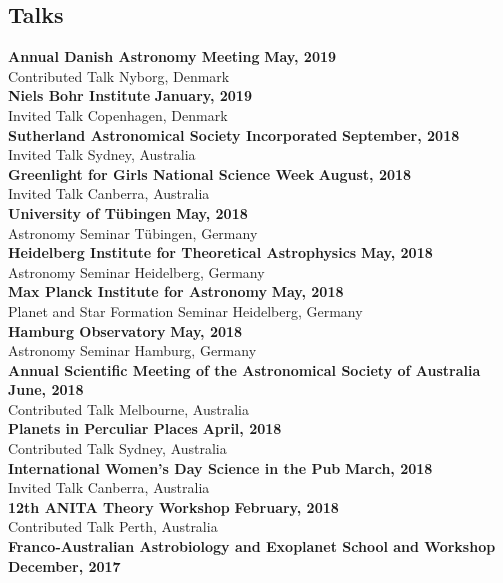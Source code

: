\documentclass[margin,line]{res}
\begin{document}
\begin{resume}
		\section{\sc Talks}
		{\bf Annual Danish Astronomy Meeting} \hfill {\bf May, 2019}\\
		Contributed Talk \hfill Nyborg, Denmark\\
		{\bf Niels Bohr Institute} \hfill {\bf January, 2019}\\
		Invited Talk \hfill Copenhagen, Denmark\\
		{\bf Sutherland Astronomical Society Incorporated} \hfill {\bf September, 2018}\\
		Invited Talk \hfill Sydney, Australia\\
		{\bf Greenlight for Girls National Science Week} \hfill {\bf August, 2018}\\
		Invited Talk \hfill Canberra, Australia\\
		{\bf University of T\"ubingen} \hfill {\bf May, 2018}\\
		Astronomy Seminar \hfill T\"ubingen, Germany\\
		{\bf Heidelberg Institute for Theoretical Astrophysics} \hfill {\bf May, 2018}\\
		Astronomy Seminar \hfill Heidelberg, Germany\\
		{\bf Max Planck Institute for Astronomy} \hfill {\bf May, 2018}\\
		Planet and Star Formation Seminar \hfill Heidelberg, Germany\\
		{\bf Hamburg Observatory} \hfill {\bf May, 2018}\\
		Astronomy Seminar \hfill Hamburg, Germany\\
		{\bf Annual Scientific Meeting of the Astronomical Society of Australia} \hfill {\bf June, 2018}\\
		Contributed Talk \hfill Melbourne, Australia\\
		{\bf Planets in Perculiar Places} \hfill {\bf April, 2018}\\
		Contributed Talk \hfill Sydney, Australia\\
		{\bf International Women's Day Science in the Pub} \hfill {\bf March, 2018}\\
		Invited Talk \hfill Canberra, Australia\\
		{\bf 12th ANITA Theory Workshop} \hfill {\bf February, 2018}\\
		Contributed Talk \hfill Perth, Australia\\
		{\bf Franco-Australian Astrobiology and Exoplanet School and Workshop} \hfill {\bf December, 2017}\\

\end{resume}
\end{document}
